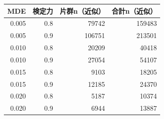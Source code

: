 \begin{tabular}{rrrr}
\toprule
MDE & 検定力 & 片群n（近似） & 合計n（近似） \\
\midrule
0.005 & 0.8 & 79742 & 159483 \\
0.005 & 0.9 & 106751 & 213501 \\
0.010 & 0.8 & 20209 & 40418 \\
0.010 & 0.9 & 27054 & 54107 \\
0.015 & 0.8 & 9103 & 18205 \\
0.015 & 0.9 & 12185 & 24370 \\
0.020 & 0.8 & 5187 & 10374 \\
0.020 & 0.9 & 6944 & 13887 \\
\bottomrule
\end{tabular}
